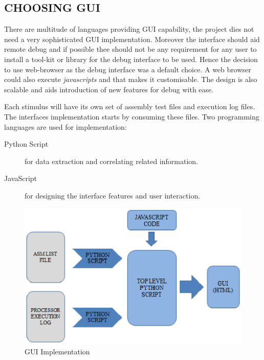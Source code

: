 
\subsection {CHOOSING GUI}
There are multitude of languages providing GUI capability, the project dies not need a very sophisticated GUI implementation. Moreover the interface should aid remote debug and if possible thee should not be any requirement for any user to install a tool-kit or library for the debug interface to be used. Hence the decision to use web-browser as the debug interface was a default choice. A web browser could also execute {\it javascripts} and that makes it customisable. The design is also scalable and aids introduction of new features for debug with ease.

Each stimulus will have its own set of assembly test files and execution log files. The interfaces implementation starts by consuming these files. Two programming languages are used for implementation:
\begin{description}
\item[Python Script] for data extraction and correlating related information.
\item[JavaScript] for designing the interface features and user interaction.
\end{description}

\begin{figure}[h]
\centering
\includegraphics[width=5.5in]{./figures/gui_impl.eps}
\caption{GUI Implementation} 
\label{fig:gui_impl.eps}
\end{figure}

